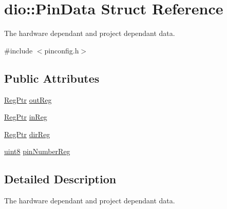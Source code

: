 \hypertarget{structdio_1_1PinData}{\section{dio\+:\+:Pin\+Data Struct Reference}
\label{structdio_1_1PinData}
}


The hardware dependant and project dependant data.  




{\ttfamily \#include $<$pinconfig.\+h$>$}

\subsection*{Public Attributes}
\begin{DoxyCompactItemize}
\item 
\hyperlink{group__MCAL_ga04fdc1fe49b1d3534ac782b9c9831667}{Reg\+Ptr} \hyperlink{structdio_1_1PinData_a6c9ea45b924aa81bf61a9653f76d0156}{out\+Reg}
\item 
\hyperlink{group__MCAL_ga04fdc1fe49b1d3534ac782b9c9831667}{Reg\+Ptr} \hyperlink{structdio_1_1PinData_ae48e40979dfcc1617f72b20e3c4d0b63}{in\+Reg}
\item 
\hyperlink{group__MCAL_ga04fdc1fe49b1d3534ac782b9c9831667}{Reg\+Ptr} \hyperlink{structdio_1_1PinData_a6e1d66e7340bdbb5cdf58cd6ae1509a0}{dir\+Reg}
\item 
\hyperlink{types_8h_a3c77e3a247345b581bdb6939ffe95a94}{uint8} \hyperlink{structdio_1_1PinData_ae07b5d5d44887270452bc0901268b3d1}{pin\+Number\+Reg}
\end{DoxyCompactItemize}


\subsection{Detailed Description}
The hardware dependant and project dependant data. 

